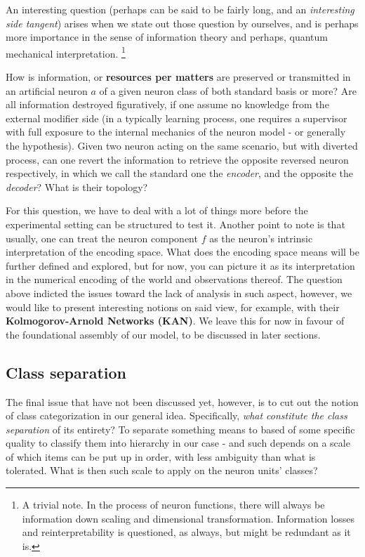 An interesting question (perhaps can be said to be fairly long, and an \textit{interesting side tangent}) arises when we state out those question by ourselves, and is perhaps more importance in the sense of information theory and perhaps, quantum mechanical interpretation. \footnote{A trivial note. In the process of neuron functions, there will always be information down scaling and dimensional transformation. Information losses and reinterpretability is questioned, as always, but might be redundant as it is. }
\begin{question}
    How is information, or \textbf{resources per matters} are preserved or transmitted in an artificial neuron $a$ of a given neuron class of both standard basis or more? Are all information destroyed figuratively, if one assume no knowledge from the external modifier side (in a typically learning process, one requires a supervisor with full exposure to the internal mechanics of the neuron model - or generally the hypothesis). Given two neuron acting on the same scenario, but with diverted process, can one revert the information to retrieve the opposite reversed neuron respectively, in which we call the standard one the \textit{encoder}, and the opposite the \textit{decoder}? What is their topology?
\end{question}
For this question, we have to deal with a lot of things more before the experimental setting can be structured to test it. Another point to note is that usually, one can treat the neuron component $f$ as the neuron's intrinsic interpretation of the encoding space. What does the encoding space means will be further defined and explored, but for now, you can picture it as its interpretation in the numerical encoding of the world and observations thereof. The question above indicted the issues toward the lack of analysis in such aspect, however, we would like to present interesting notions on said view, for example, \cite{liu2025kankolmogorovarnoldnetworks} with their \textbf{Kolmogorov-Arnold Networks (KAN)}. We leave this for now in favour of the foundational assembly of our model, to be discussed in later sections.  
\subsection{Class separation}
The final issue that have not been discussed yet, however, is to cut out the notion of class categorization in our general idea. Specifically, \textit{what constitute the class separation} of its entirety? To separate something means to based of some specific quality to classify them into hierarchy in our case - and such depends on a scale of which items can be put up in order, with less ambiguity than what is tolerated. What is then such scale to apply on the neuron units' classes? 

